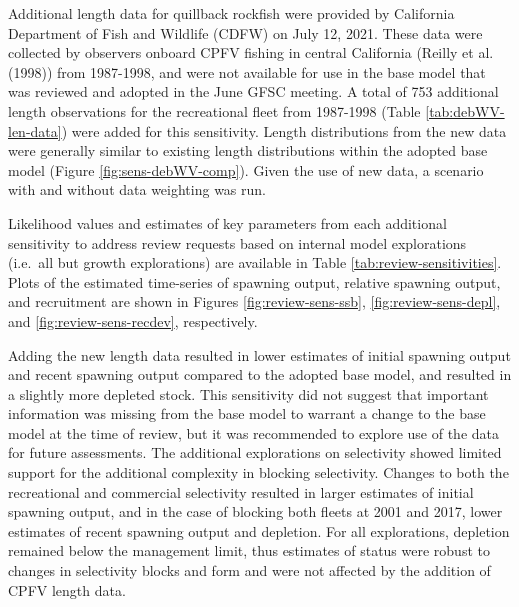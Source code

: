 \documentclass[11pt,
  english,
  letterpaper,
]{article}
\begin{document}
Additional length data for quillback rockfish were provided by California Department of Fish and Wildlife (CDFW) on July 12, 2021. These data were collected by observers onboard CPFV fishing in central California ({Reilly et al. (1998)\leavevmode\tagmcend\tagstructend}) from 1987-1998, and were not available for use in the base model that was reviewed and adopted in the June GFSC meeting. A total of 753 additional length observations for the recreational fleet from 1987-1998 (Table \ref{tab:debWV-len-data}) were added for this sensitivity. Length distributions from the new data were generally similar to existing length distributions within the adopted base model (Figure \ref{fig:sens-debWV-comp}). Given the use of new data, a scenario with and without data weighting was run.

\leavevmode\tagmcend\tagstructend\par


Likelihood values and estimates of key parameters from each additional sensitivity to address review requests based on internal model explorations (i.e.~all but growth explorations) are available in Table \ref{tab:review-sensitivities}. Plots of the estimated time-series of spawning output, relative spawning output, and recruitment are shown in Figures \ref{fig:review-sens-ssb}, \ref{fig:review-sens-depl}, and \ref{fig:review-sens-recdev}, respectively.

\leavevmode\tagmcend\tagstructend\par


Adding the new length data resulted in lower estimates of initial spawning output and recent spawning output compared to the adopted base model, and resulted in a slightly more depleted stock. This sensitivity did not suggest that important information was missing from the base model to warrant a change to the base model at the time of review, but it was recommended to explore use of the data for future assessments. The additional explorations on selectivity showed limited support for the additional complexity in blocking selectivity. Changes to both the recreational and commercial selectivity resulted in larger estimates of initial spawning output, and in the case of blocking both fleets at 2001 and 2017, lower estimates of recent spawning output and depletion. For all explorations, depletion remained below the management limit, thus estimates of status were robust to changes in selectivity blocks and form and were not affected by the addition of CPFV length data.
\end{document}
